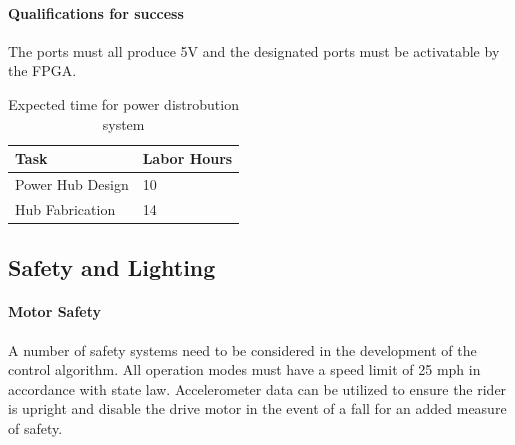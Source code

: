 \documentclass[12pt,article]{IEEEtran}
\begin{document}
        \paragraph{\bfseries Qualifications for success}
        The ports must all produce 5V and the designated ports must be activatable by the FPGA.
            
      
      
        \begin{table}[H]        
            \renewcommand{\arraystretch}{1.3}
                \caption{Expected time for power distrobution system}
                
                \label{Expected time for power distrobution system}
                
                \centering
                \begin{tabular}{p{5.5cm}|p{2cm}}
                \hline
                \bfseries   Task                        & \bfseries Labor Hours                         \\
                \hline\hline
                            Power Hub Design            & 10                                             \\
                            Hub Fabrication             & 14                                            \\  
                            \hline  
                \end{tabular}
        \end{table}
        
    \subsection{\bfseries Safety and Lighting}
        \paragraph{\bfseries Motor Safety}
            A number of safety systems need to be considered in the development of the control algorithm. All 
            operation modes must have a speed limit of 25 mph in accordance with state law. Accelerometer data 
            can be utilized to ensure the rider is upright and disable the drive motor in the event of a fall 
            for an added measure of safety. 
    
\end{document}
